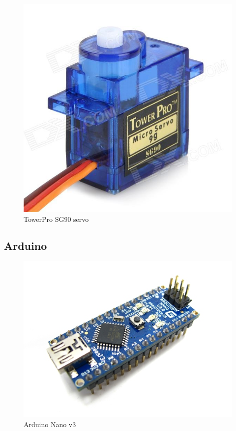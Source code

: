 		\begin{figure}[H]
			\centering
			\includegraphics[scale=0.25]{images/ProjectComponents/servo2.jpg}
			\caption{TowerPro SG90 servo }
			\label{}
	\end{figure}
	\bigskip


\subsection{Arduino}

	\begin{figure}[H]
			\centering
			\includegraphics[scale=0.4]{images/ProjectComponents/arduino.jpg}
			\caption{Arduino Nano v3 }
			\label{}
	\end{figure}
	\bigskip

